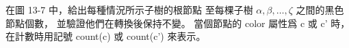 \startEXERCISE
在圖 13-7 中，給出每種情況所示子樹的根節點
至每棵子樹 $\alpha,\beta,\ldots,\zeta$ 之間的黑色節點個數，
並驗證他們在轉換後保持不變。
當個節點的 color 屬性爲 c 或 c' 時，
在計數時用記號 count(c) 或 count(c') 來表示。
\stopEXERCISE

\startANSWER
\externalfigure[e13_4_6-1]

\externalfigure[e13_4_6-2]

\externalfigure[e13_4_6-3]

\externalfigure[e13_4_6-4]
\stopANSWER
